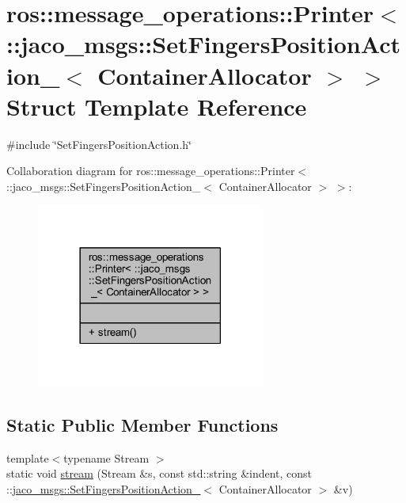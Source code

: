 \hypertarget{structros_1_1message__operations_1_1Printer_3_01_1_1jaco__msgs_1_1SetFingersPositionAction___3_01ContainerAllocator_01_4_01_4}{}\section{ros\+:\+:message\+\_\+operations\+:\+:Printer$<$ \+:\+:jaco\+\_\+msgs\+:\+:Set\+Fingers\+Position\+Action\+\_\+$<$ Container\+Allocator $>$ $>$ Struct Template Reference}
\label{structros_1_1message__operations_1_1Printer_3_01_1_1jaco__msgs_1_1SetFingersPositionAction___3_01ContainerAllocator_01_4_01_4}


{\ttfamily \#include \char`\"{}Set\+Fingers\+Position\+Action.\+h\char`\"{}}



Collaboration diagram for ros\+:\+:message\+\_\+operations\+:\+:Printer$<$ \+:\+:jaco\+\_\+msgs\+:\+:Set\+Fingers\+Position\+Action\+\_\+$<$ Container\+Allocator $>$ $>$\+:
\nopagebreak
\begin{figure}[H]
\begin{center}
\leavevmode
\includegraphics[width=213pt]{dd/dc3/structros_1_1message__operations_1_1Printer_3_01_1_1jaco__msgs_1_1SetFingersPositionAction___3_0a2a7fac9eb5819e8a193c9ea47e429b4}
\end{center}
\end{figure}
\subsection*{Static Public Member Functions}
\begin{DoxyCompactItemize}
\item 
{\footnotesize template$<$typename Stream $>$ }\\static void \hyperlink{structros_1_1message__operations_1_1Printer_3_01_1_1jaco__msgs_1_1SetFingersPositionAction___3_01ContainerAllocator_01_4_01_4_af3d00065aec849c10d9d4dcaeb49b8f1}{stream} (Stream \&s, const std\+::string \&indent, const \+::\hyperlink{structjaco__msgs_1_1SetFingersPositionAction__}{jaco\+\_\+msgs\+::\+Set\+Fingers\+Position\+Action\+\_\+}$<$ Container\+Allocator $>$ \&v)
\end{DoxyCompactItemize}


